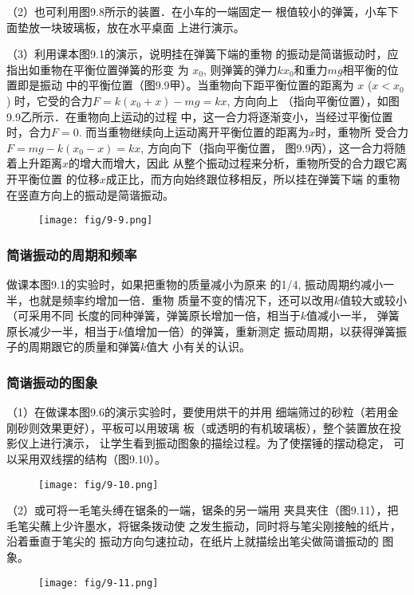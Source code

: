 （2）也可利用图9.8所示的装置．在小车的一端固定一
根值较小的弹簧，小车下面垫放一块玻璃板，放在水平桌面
上进行演示。

（3）利用课本图9.1的演示，说明挂在弹簧下端的重物
的振动是简谐振动时，应指出如重物在平衡位置弹簧的形变
为
$x_0$, 则弹簧的弹力$kx_0$和重力$mg$相平衡的位置即是振动
中的平衡位置（图9.9甲）。当重物向下距平衡位置的距离为
$x$ ($x<x_0$) 时，它受的合力$F=k(x_0+x)-mg=kx$, 方向向上
（指向平衡位置），如图9.9乙所示．在重物向上运动的过程
中，这一合力将逐渐变小，当经过平衡位置时，合力$F=0$.
而当重物继续向上运动离开平衡位置的距离为$x$时，重物所
受合力$F=mg-k(x_0-x)=kx$, 方向向下（指向平衡位置，
图9.9丙），这一合力将随着上升距离$x$的增大而增大，因此
从整个振动过程来分析，重物所受的合力跟它离开平衡位置
的位移$x$成正比，而方向始终跟位移相反，所以挂在弹簧下端
的重物在竖直方向上的振动是简谐振动。

\begin{figure}[htp]
    \centering
    \texttt{[image: fig/9-9.png]}
    \caption{}
\end{figure}

\subsubsection{简谐振动的周期和频率}
做课本图9.1的实验时，如果把重物的质量减小为原来
的1/4, 振动周期约减小一半，也就是频率约增加一倍．重物
质量不变的情况下，还可以改用$k$值较大或较小（可采用不同
长度的同种弹簧，弹簧原长增加一倍，相当于$k$值减小一半，
弹簧原长减少一半，相当于$k$值增加一倍）的弹簧，重新测定
振动周期，以获得弹簧振子的周期跟它的质量和弹簧$k$值大
小有关的认识。


\subsubsection{简谐振动的图象}
（1）在做课本图9.6的演示实验时，要使用烘干的并用
细端筛过的砂粒（若用金刚砂则效果更好），平板可以用玻璃
板（或透明的有机玻璃板），整个装置放在投影仪上进行演示，
让学生看到振动图象的描绘过程。为了使摆锤的摆动稳定，
可以采用双线摆的结构（图9.10）。
\begin{figure}[htp]
    \centering
    \texttt{[image: fig/9-10.png]}
    \caption{}
\end{figure}

（2）或可将一毛笔头缚在锯条的一端，锯条的另一端用
夹具夹住（图9.11），把毛笔尖蘸上少许墨水，将锯条拨动使
之发生振动，同时将与笔尖刚接触的纸片，沿着垂直于笔尖的
振动方向匀速拉动，在纸片上就描绘出笔尖做简谱振动的
图象。
\begin{figure}[htp]
    \centering
    \texttt{[image: fig/9-11.png]}
    \caption{}
\end{figure}

